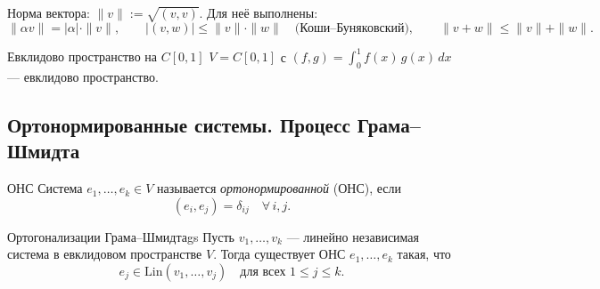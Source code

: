 Норма вектора: $\|v\| := \sqrt{(v,v)}$. Для неё выполнены:
\[
\|\alpha v\| = |\alpha|\cdot\|v\|, \qquad
|(v,w)| \leq \|v\|\cdot\|w\| \quad \text{(Коши--Буняковский)}, \qquad
\|v+w\| \leq \|v\| + \|w\|.
\]

\begin{Example}{Евклидово пространство на $C[0,1]$}{}
	$V = C[0,1]$ с $(f,g) = \displaystyle\int_0^1 f(x)\,g(x)\,dx$ — евклидово пространство.
\end{Example}

\subsection{Ортонормированные системы. Процесс Грама–Шмидта}

\begin{Definition}{ОНС}{}
	Система $e_1,\ldots,e_k \in V$ называется \textit{ортонормированной} (ОНС), если
	\[
	(e_i, e_j) = \delta_{ij} \quad \forall\, i, j.
	\]
\end{Definition}

\begin{Theorem}{Ортогонализации Грама–Шмидта}{gs}
	Пусть $v_1,\ldots,v_k$ — линейно независимая система в евклидовом пространстве $V$.
	Тогда существует ОНС $e_1,\ldots,e_k$ такая, что
	\[
	e_j \in \mathrm{Lin}(v_1,\ldots,v_j) \quad \text{для всех } 1 \leq j \leq k.
	\]
\end{Theorem}